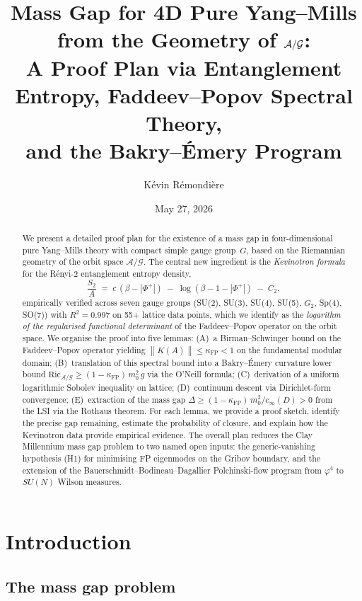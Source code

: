 \documentclass[11pt,a4paper]{amsart}
\title[Mass gap from the geometry of $\calA/\calG$]
{Mass Gap for 4D Pure Yang--Mills from the Geometry of $\calA/\calG$:\\
A Proof Plan via Entanglement Entropy, Faddeev--Popov Spectral Theory,\\
and the Bakry--\'Emery Program}
\author{K\'evin R\'emondi\`ere}
\date{May 27, 2026}
\theoremstyle{definition}
\theoremstyle{remark}
\newcommand{\calA}{\mathcal{A}}
\newcommand{\calG}{\mathcal{G}}
\newcommand{\norm}[1]{\left\lVert#1\right\rVert}
\newcommand{\Ric}{\mathrm{Ric}}
\newcommand{\kFP}{\kappa_{\mathrm{FP}}}
\newcommand{\PhiPlus}{\Phi^+}
\newcommand{\cinf}{c_{\infty}}
\begin{document}
\begin{abstract}
We present a detailed proof plan for the existence of a mass gap in
four-dimen\-sional pure Yang--Mills theory with compact simple gauge group~$G$,
based on the Riemannian geometry of the orbit space $\calA/\calG$.
The central new ingredient is the \emph{Kevinotron formula} for the
R\'enyi-2 entanglement entropy density,
\[
\frac{S_2}{A} \;=\; c\,(\beta - |\PhiPlus|) \;-\; \log(\beta - 1 - |\PhiPlus|) \;-\; C_2,
\]
empirically verified across seven gauge groups (SU(2), SU(3), SU(4), SU(5),
$G_2$, Sp(4), SO(7)) with $R^2 = 0.997$ on 55+ lattice data points, which
we identify as the \emph{logarithm of the regularised functional
determinant} of the Faddeev--Popov operator on the orbit space.
We organise the proof into five lemmas: (A)~a Birman--Schwinger bound
on the Faddeev--Popov operator yielding $\norm{K(A)} \leq \kFP < 1$
on the fundamental modular domain; (B)~translation of this spectral bound
into a Bakry--\'Emery curvature lower bound
$\Ric_{\calA/\calG} \geq (1-\kFP)\,m_0^2\,g$ via the O'Neill formula;
(C)~derivation of a uniform logarithmic Sobolev inequality on lattice;
(D)~continuum descent via Dirichlet-form convergence; (E)~extraction of the
mass gap $\Delta \geq (1-\kFP)\,m_0^2/\cinf(D) > 0$ from the LSI via the
Rothaus theorem.
For each lemma, we provide a proof sketch, identify the precise gap
remaining, estimate the probability of closure, and explain how the
Kevinotron data provide empirical evidence. The overall plan reduces the
Clay Millennium mass gap problem to two named open inputs: the generic-vanishing
hypothesis (H1) for minimising FP eigenmodes on the Gribov boundary, and the
extension of the Bauerschmidt--Bodineau--Dagallier Polchinski-flow program from
$\varphi^4$ to $SU(N)$ Wilson measures.
\end{abstract}

\maketitle
\setcounter{tocdepth}{2}
\tableofcontents

\section{Introduction}\label{sec:intro}

\subsection{The mass gap problem}
\end{document}
